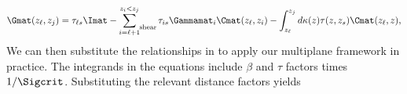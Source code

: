 \begin{equation}
\Gmat(z_\ell, z_j) = \tau_{\ell s}\Imat - \sum\limits_{i =\ell +1}^{z_i < z_j}\mathop{}_{\mkern-5mu \rm{shear}} \tau_{is} \Gammamat_i \Cmat(z_\ell, z_i) \\
- \int_{z_\ell}^{z_j} d\kappa(z) \tau(z, z_s) \Cmat(z_\ell, z),
\end{equation}
We can then substitute the relationships in  to apply our multiplane framework in practice. The integrands in the equations include $\beta$ and $\tau$ factors times $1/\Sigcrit$. Substituting the relevant distance factors yields
  